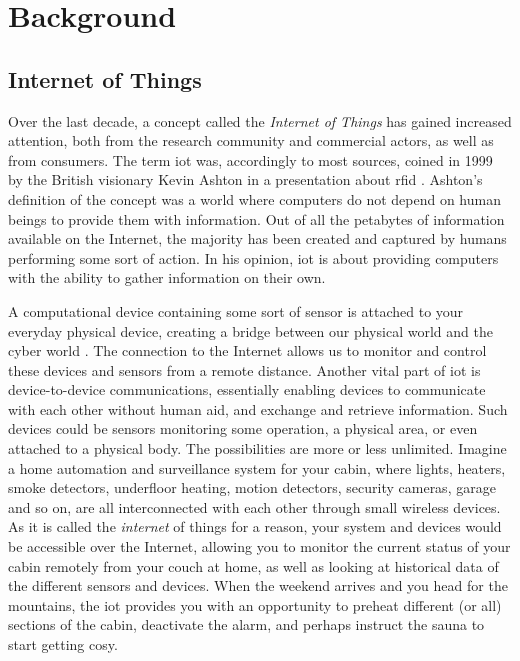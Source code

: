 \chapter{Background}
\label{chp:background}

\section{Internet of Things}
\label{sec:iot}

Over the last decade, a concept called the \emph{Internet of Things} has gained increased attention, both from the research community and commercial actors, as well as from consumers. The term \gls{iot} was, accordingly to most sources, coined in 1999 by the British visionary Kevin Ashton in a presentation about \gls{rfid} \cite{iot-phrase-2} \cite{iot-phrase-1}. Ashton's definition of the concept was a world where computers do not depend on human beings to provide them with information. Out of all the petabytes of information available on the Internet, the majority has been created and captured by humans performing some sort of action. In his opinion, \gls{iot} is about providing computers with the ability to gather information on their own.






A computational device containing some sort of sensor is attached to your everyday physical device, creating a bridge between our physical world and the cyber world \cite{Kopetz2011}. The connection to the Internet allows us to monitor and control these devices and sensors from a remote distance. Another vital part of \gls{iot} is device-to-device communications, essentially enabling devices to communicate with each other without human aid, and exchange and retrieve information. Such devices could be sensors monitoring some operation, a physical area, or even attached to a physical body. The possibilities are more or less unlimited. Imagine a home automation and surveillance system for your cabin, where lights, heaters, smoke detectors, underfloor heating, motion detectors, security cameras, garage and so on, are all interconnected with each other through small wireless devices. As it is called the \emph{internet} of things for a reason, your system and devices would be accessible over the Internet, allowing you to monitor the current status of your cabin remotely from your couch at home, as well as looking at historical data of the different sensors and devices. When the weekend arrives and you head for the mountains, the \gls{iot} provides you with an opportunity to preheat different (or all) sections of the cabin, deactivate the alarm, and perhaps instruct the sauna to start getting cosy. 


